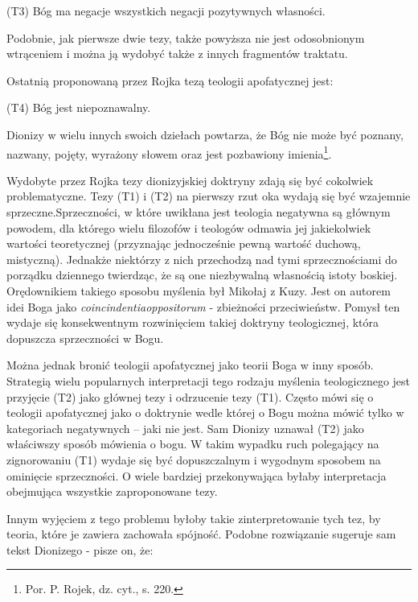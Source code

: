 \bigskip

\noindent (T3) Bóg ma negacje wszystkich negacji pozytywnych własności.


\bigskip

Podobnie, jak pierwsze dwie tezy, także powyższa nie jest odosobnionym
wtrąceniem i można ją wydobyć także z innych fragmentów traktatu.

Ostatnią proponowaną przez Rojka tezą teologii apofatycznej jest:


\bigskip

\noindent (T4) Bóg jest niepoznawalny.


\bigskip

Dionizy w wielu innych swoich dziełach powtarza, że Bóg nie może być
poznany, nazwany, pojęty, wyrażony słowem oraz jest pozbawiony
imienia\footnote{Por. P. Rojek, dz. cyt., s. 220. }.

Wydobyte przez Rojka tezy dionizyjskiej doktryny zdają się być cokolwiek
problematyczne. Tezy (T1) i (T2) na pierwszy rzut oka wydają się być
wzajemnie sprzeczne.Sprzeczności, w które uwikłana jest teologia
negatywna są głównym powodem, dla którego wielu filozofów i teologów
odmawia jej jakiekolwiek wartości teoretycznej (przyznając jednocześnie
pewną wartość duchową, mistyczną). Jednakże niektórzy z nich przechodzą
nad tymi sprzecznościami do porządku dziennego twierdząc, że są one
niezbywalną własnością istoty boskiej. Orędownikiem takiego sposobu
myślenia był Mikołaj z Kuzy. Jest on autorem idei Boga jako
\textit{coincindentiaoppositorum} -  zbieżności przeciwieństw. Pomysł
ten wydaje się konsekwentnym rozwinięciem takiej doktryny teologicznej,
która dopuszcza sprzeczności w Bogu.

Można jednak bronić teologii apofatycznej jako teorii Boga w inny
sposób. Strategią wielu popularnych interpretacji tego rodzaju myślenia
teologicznego jest przyjęcie (T2) jako głównej tezy i odrzucenie tezy
(T1). Często mówi się o teologii apofatycznej jako o doktrynie wedle
której o Bogu można mówić tylko w kategoriach negatywnych -- jaki nie
jest. Sam Dionizy uznawał (T2) jako właściwszy sposób mówienia o bogu.
W takim wypadku ruch polegający na zignorowaniu (T1) wydaje się być
dopuszczalnym i wygodnym sposobem na ominięcie sprzeczności. O wiele
bardziej przekonywająca byłaby interpretacja obejmująca wszystkie
zaproponowane tezy.

Innym wyjęciem z tego problemu byłoby takie zinterpretowanie tych tez,
by teoria, które je zawiera zachowała spójność. Podobne rozwiązanie
sugeruje sam tekst Dionizego -  pisze on, że:

